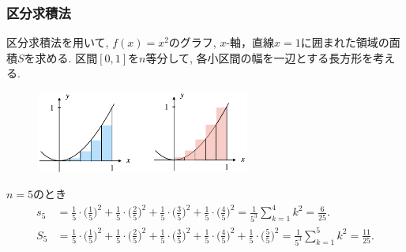 \documentclass[dvipdfmx,cjk,10.2pt]{beamer}
\theoremstyle{definition}
\begin{document}
\begin{frame}
\frametitle{区分求積法}

区分求積法を用いて, $f(x)=x^2$のグラフ, $x$-軸，直線$x=1$に囲まれた領域の面積$S$を求める. 
区間$[0,1]$を$n$等分して, 各小区間の幅を一辺とする長方形を考える. 
\vspace{-2mm}

\begin{figure}[htbp]
 \begin{center} 
  \includegraphics[width=70mm]{RiemannSum.png}
 \end{center}
\end{figure}

\vspace{-3mm}

$n=5$のとき
{\small 
\begin{align*}
s_5 &= \frac{1}{5} \cdot \big(\frac{1}{5}\big)^2+\frac{1}{5} \cdot \big(\frac{2}{5}\big)^2+\frac{1}{5} \cdot \big(\frac{3}{5}\big)^2 + \frac{1}{5} \cdot \big(\frac{4}{5}\big)^2
= \frac{1}{5^3}\sum_{k=1}^4 k^2=\frac{6}{25}. \\
S_5 &= \frac{1}{5} \cdot \big(\frac{1}{5}\big)^2+\frac{1}{5} \cdot \big(\frac{2}{5}\big)^2+\frac{1}{5} \cdot \big(\frac{3}{5}\big)^2 
+ \frac{1}{5} \cdot \big(\frac{4}{5}\big)^2 + \frac{1}{5} \cdot \big(\frac{5}{5}\big)^2
= \frac{1}{5^3}\sum_{k=1}^5 k^2=\frac{11}{25}. 
\end{align*}
}

\end{frame}


\end{document}
